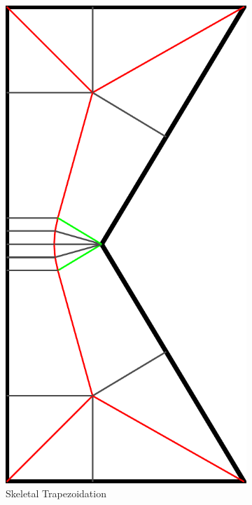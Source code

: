 \begin{figure}
\begin{subfigure}[t]{\figwidth}\centering
\includegraphics[height=\figwidthTwo]{sources-method-simple-skeleton-st}
\caption{Skeletal Trapezoidation}\label{shape_decomposition_st}
\end{subfigure}
\begin{subfigure}[t]{\figwidth}\centering

\end{subfigure}
\end{figure}
